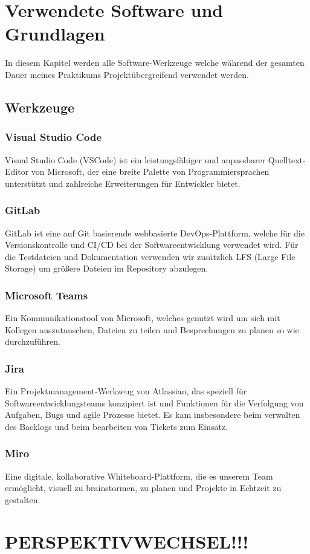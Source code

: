 \section{Verwendete Software und Grundlagen}
In diesem Kapitel werden alle Software-Werkzeuge welche während der gesamten Dauer meines Praktikums Projektübergreifend
verwendet werden.


\subsection{Werkzeuge}

\subsubsection{Visual Studio Code}
Visual Studio Code (VSCode) ist ein leistungsfähiger und anpassbarer Quelltext-Editor von Microsoft, der eine breite
Palette von Programmiersprachen unterstützt und zahlreiche Erweiterungen für Entwickler bietet. 

\subsubsection{GitLab}
GitLab ist eine auf Git basierende webbasierte DevOps-Plattform, welche für die Versionskontrolle und CI/CD bei der
Softwareentwicklung verwendet wird. Für die Testdateien und Dokumentation verwenden wir zusätzlich LFS (Large File
Storage) um größere Dateien im Repository abzulegen.

\subsubsection{Microsoft Teams}
Ein Kommunikationstool von Microsoft, welches genutzt wird um sich mit Kollegen auszutauschen, Dateien zu teilen und
Besprechungen zu planen so wie durchzuführen.

\subsubsection{Jira}
Ein Projektmanagement-Werkzeug von Atlassian, das speziell für Softwareentwicklungsteams konzipiert ist und Funktionen
für die Verfolgung von Aufgaben, Bugs und agile Prozesse bietet. Es kam insbesondere beim verwalten des Backlogs und
beim bearbeiten von Tickets zum Einsatz.

\subsubsection{Miro}
Eine digitale, kollaborative Whiteboard-Plattform, die es unserem Team ermöglicht, visuell zu brainstormen, zu planen
und Projekte in Echtzeit zu gestalten.

\section{PERSPEKTIVWECHSEL!!!}